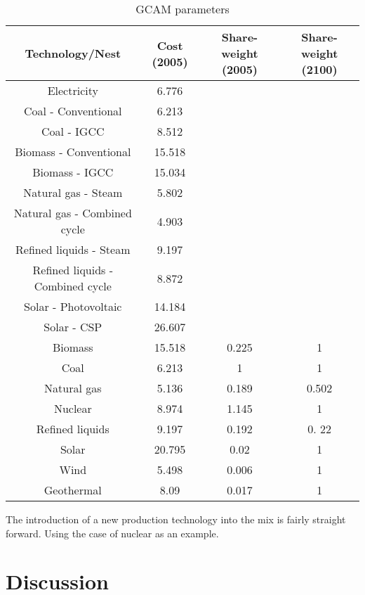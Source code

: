 \documentclass[10pt]{amsart}
\begin{document}
\begin{table}
\caption{GCAM parameters}
\centering
\begin{tabular}{c c c c}
\hline
\hline
Technology/Nest & Cost (2005) & Share-weight (2005) & Share-weight (2100) \\ [0.5ex]
\hline
Electricity & 6.776 & & \\
\hline
\hline
Coal - Conventional & 6.213 & & \\
Coal - IGCC & 8.512 & & \\
Biomass - Conventional & 15.518 & & \\
Biomass - IGCC & 15.034 & & \\
Natural gas - Steam & 5.802 & & \\
Natural gas - Combined cycle & 4.903  & & \\
Refined liquids - Steam & 9.197 & & \\
Refined liquids - Combined cycle & 8.872 & & \\
Solar - Photovoltaic & 14.184 & & \\
Solar - CSP & 26.607 & & \\
\hline 
\hline
Biomass & 15.518 & 0.225 & 1 \\
Coal & 6.213 & 1 & 1 \\
Natural gas & 5.136 & 0.189 & 0.502 \\
Nuclear & 8.974 & 1.145 & 1 \\
Refined liquids & 9.197 & 0.192 & 0. 22 \\
Solar & 20.795 & 0.02 & 1 \\
Wind & 5.498 & 0.006 & 1 \\
Geothermal & 8.09 & 0.017 & 1 \\ [1ex]
\hline
\end{tabular}
\label{table:nl.1}
\end{table}



The introduction of a new production technology into the mix is fairly straight forward. 
Using the case of nuclear as an example.


\section{Discussion}



\newpage
{}
\begin{landscape}
\end{landscape}
\restoregeometry



\newpage
\printbibliography
\end{document}
